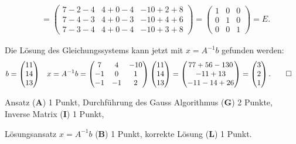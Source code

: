 \begin{loesung}
\begin{teilaufgaben}
\begin{align*}
\\
&=
\begin{pmatrix}
7-2-4&4+0-4&-10+2+8\\
7-4-3&4+0-3&-10+4+6\\
7-3-4&4+0-4&-10+3+8
\end{pmatrix}
=\begin{pmatrix}
1&0&0\\
0&1&0\\
0&0&1
\end{pmatrix}=E.
\end{align*}
\item Die Lösung des Gleichungssystems kann jetzt mit $x=A^{-1}b$ gefunden
werden:
\begin{align*}
b&=
\begin{pmatrix}11\\14\\13\end{pmatrix}
&
x&=A^{-1}b=
\begin{pmatrix}
 7& 4&-10\\
-1& 0&  1\\
-1&-1&  2
\end{pmatrix}
\begin{pmatrix}11\\14\\13\end{pmatrix}
=
\begin{pmatrix}
77+56-130\\
-11+13\\
-11-14+26
\end{pmatrix}
=
\begin{pmatrix}
3\\
2\\
1
\end{pmatrix}.
\qedhere
\end{align*}
\end{teilaufgaben}
\end{loesung}

\begin{bewertung}
\begin{teilaufgaben}
\item
Ansatz (\textbf{A}) 1 Punkt,
Durchführung des Gauss Algorithmus (\textbf{G}) 2 Punkte,
Inverse Matrix (\textbf{I}) 1 Punkt,
\item
Lösungsansatz $x=A^{-1}b$ (\textbf{B}) 1 Punkt,
korrekte Lösung (\textbf{L}) 1 Punkt.
\end{teilaufgaben}
\end{bewertung}

